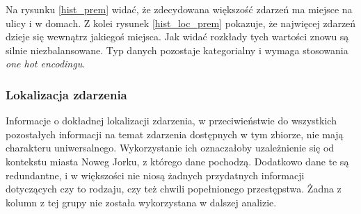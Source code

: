 \documentclass{classrep}
\begin{document}
{{{                Na rysunku \ref{hist_prem} widać, że zdecydowana większość zdarzeń ma miejsce na ulicy i w domach. Z kolei rysunek \ref{hist_loc_prem} pokazuje, że najwięcej zdarzeń dzieje się wewnątrz jakiegoś miejsca. Jak widać rozkłady tych wartości znowu są silnie niezbalansowane. Typ danych pozostaje kategorialny i wymaga stosowania \emph{one hot encodingu}.
            }

            \subsubsection{Lokalizacja zdarzenia} {
                Informacje o dokładnej lokalizacji zdarzenia, w przeciwieństwie do wszystkich pozostałych informacji na temat zdarzenia dostępnych w tym zbiorze, nie mają charakteru uniwersalnego. Wykorzystanie ich oznaczałoby uzależnienie się od kontekstu miasta Noweg Jorku, z którego dane pochodzą. Dodatkowo dane te są redundantne, i w większości nie niosą żadnych przydatnych informacji dotyczących czy to rodzaju, czy też chwili popełnionego przestępstwa. Żadna z kolumn z tej grupy nie została wykorzystana w dalszej analizie.
            }

}}
\end{document}
